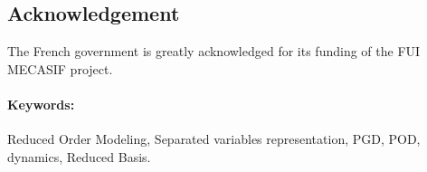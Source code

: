 \documentclass[12pt,a4paper]{article}
\begin{document}
\subsection*{Acknowledgement}
The French government is greatly acknowledged for its funding of the FUI MECASIF project.
\paragraph*{Keywords:}
Reduced Order Modeling, Separated variables representation, PGD, POD, dynamics, Reduced Basis.


\end{document}
